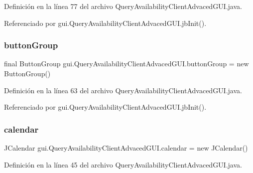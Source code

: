 Definición en la línea 77 del archivo Query\+Availability\+Client\+Advaced\+G\+U\+I.\+java.



Referenciado por gui.\+Query\+Availability\+Client\+Advaced\+G\+U\+I.\+jb\+Init().

\mbox{\label{classgui_1_1_query_availability_client_advaced_g_u_i_ae4d5a42f1a3c5b1f36444e1903f213f9}} 
\subsubsection{\texorpdfstring{buttonGroup}{buttonGroup}}
{\footnotesize\ttfamily final Button\+Group gui.\+Query\+Availability\+Client\+Advaced\+G\+U\+I.\+button\+Group = new Button\+Group()\hspace{0.3cm}{\ttfamily [private]}}



Definición en la línea 63 del archivo Query\+Availability\+Client\+Advaced\+G\+U\+I.\+java.



Referenciado por gui.\+Query\+Availability\+Client\+Advaced\+G\+U\+I.\+jb\+Init().

\mbox{\label{classgui_1_1_query_availability_client_advaced_g_u_i_a7612f7358345c96e8c1a338c54a30371}} 
\subsubsection{\texorpdfstring{calendar}{calendar}}
{\footnotesize\ttfamily J\+Calendar gui.\+Query\+Availability\+Client\+Advaced\+G\+U\+I.\+calendar = new J\+Calendar()\hspace{0.3cm}{\ttfamily [private]}}



Definición en la línea 45 del archivo Query\+Availability\+Client\+Advaced\+G\+U\+I.\+java.



